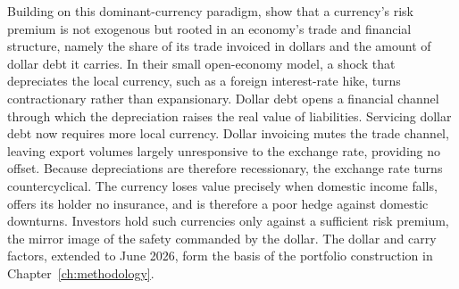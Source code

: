 Building on this dominant-currency paradigm, \textcite{dalgic_ozhan_2025} show that a currency's risk premium is not exogenous but rooted in an economy's trade and financial structure, namely the share of its trade invoiced in dollars and the amount of dollar debt it carries. In their small open-economy model, a shock that depreciates the local currency, such as a foreign interest-rate hike, turns contractionary rather than expansionary. Dollar debt opens a financial channel through which the depreciation raises the real value of liabilities. Servicing dollar debt now requires more local currency. Dollar invoicing mutes the trade channel, leaving export volumes largely unresponsive to the exchange rate, providing no offset. Because depreciations are therefore recessionary, the exchange rate turns countercyclical. The currency loses value precisely when domestic income falls, offers its holder no insurance, and is therefore a poor hedge against domestic downturns. Investors hold such currencies only against a sufficient risk premium, the mirror image of the safety commanded by the dollar. The dollar and carry factors, extended to June 2026, form the basis of the portfolio construction in Chapter~\ref{ch:methodology}.




